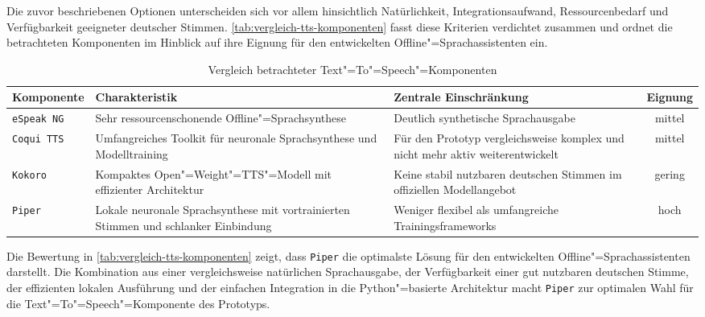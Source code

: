 Die zuvor beschriebenen Optionen unterscheiden sich vor allem hinsichtlich Natürlichkeit, Integrationsaufwand, Ressourcenbedarf und Verfügbarkeit geeigneter deutscher Stimmen. \autoref{tab:vergleich-tts-komponenten} fasst diese Kriterien verdichtet zusammen und ordnet die betrachteten Komponenten im Hinblick auf ihre Eignung für den entwickelten Offline"=Sprachassistenten ein.

\begin{table}[H]
  \caption{Vergleich betrachteter Text"=To"=Speech"=Komponenten}
  \label{tab:vergleich-tts-komponenten}
  \centering
  \setlength{\tabcolsep}{5pt}
  \begin{tabularx}{\textwidth}{l L L c}
    \toprule
    \textbf{Komponente} & \textbf{Charakteristik}                                                             & \textbf{Zentrale Einschränkung} & \textbf{Eignung} \\
    \midrule
    \texttt{eSpeak NG}
                        & Sehr ressourcenschonende Offline"=Sprachsynthese
                        & Deutlich synthetische Sprachausgabe
                        & mittel                                                                                                                                   \\
    \texttt{Coqui TTS}
                        & Umfangreiches Toolkit für neuronale Sprachsynthese und Modelltraining
                        & Für den Prototyp vergleichsweise komplex und nicht mehr aktiv weiterentwickelt
                        & mittel                                                                                                                                   \\
    \texttt{Kokoro}
                        & Kompaktes Open"=Weight"=TTS"=Modell mit effizienter Architektur
                        & Keine stabil nutzbaren deutschen Stimmen im offiziellen Modellangebot
                        & gering                                                                                                                                   \\
    \texttt{Piper}
                        & Lokale neuronale Sprachsynthese mit vortrainierten Stimmen und schlanker Einbindung
                        & Weniger flexibel als umfangreiche Trainingsframeworks
                        & hoch                                                                                                                                     \\
    \bottomrule
  \end{tabularx}
\end{table}

Die Bewertung in \autoref{tab:vergleich-tts-komponenten} zeigt, dass \texttt{Piper} die optimalste Lösung für den entwickelten Offline"=Sprachassistenten darstellt. Die Kombination aus einer vergleichsweise natürlichen Sprachausgabe, der Verfügbarkeit einer gut nutzbaren deutschen Stimme, der effizienten lokalen Ausführung und der einfachen Integration in die Python"=basierte Architektur macht \texttt{Piper} zur optimalen Wahl für die Text"=To"=Speech"=Komponente des Prototyps.